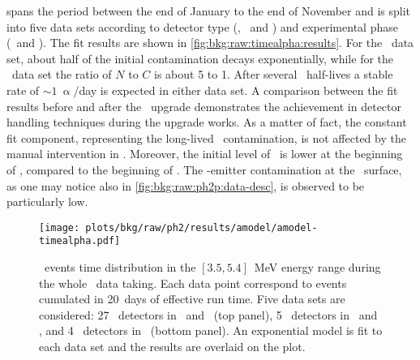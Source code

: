 spans the period between the end of January  to the end of November  and
is split into five data sets according to detector type (\bege, \scoax\ and \icoax) and
experimental phase (\phaseone\ and \phasetwop).
\newpar
The fit results are shown in \autoref{fig:bkg:raw:timealpha:results}. For the \bege\ data
set, about half of the initial contamination decays exponentially, while for the \scoax\
data set the ratio of $N$ to $C$ is about 5 to 1. After several \Po\ half-lives a stable
rate of $\sim1~\upalpha$/day is expected in either data set. A comparison between the fit
results before and after the \phasetwop\ upgrade demonstrates the achievement in detector
handling techniques during the upgrade works. As a matter of fact, the constant fit
component, representing the long-lived \Po\ contamination, is not affected by the manual
intervention in \yr{2018}. Moreover, the initial level of \Pbl\ is lower at the beginning
of \phasetwop, compared to the beginning of \phasetwo. The \a-emitter contamination at the
\icoax\ surface, as one may notice also in \cref{fig:bkg:raw:ph2p:data-desc}, is observed
to be particularly low.

\chapendgliph{}

\begin{figure}
  \centering
  \texttt{[image: plots/bkg/raw/ph2/results/amodel/amodel-timealpha.pdf]}
  \caption{%
    \a\ events time distribution in the $[3.5,5.4]$~MeV energy range during the whole
    \phasetwo\ data taking. Each data point correspond to events cumulated in 20~days of
    effective run time. Five data sets are considered: 27 \bege\ detectors in \phasetwo\ and
    \phasetwop\ (top panel), 5 \scoax\ detectors in \phasetwo\ and \phasetwop, and 4
    \icoax\ detectors in \phasetwop\ (bottom panel). An exponential model is fit to each
    data set and the results are overlaid on the plot.
  }\label{fig:bkg:raw:timealpha:results}
\end{figure}

